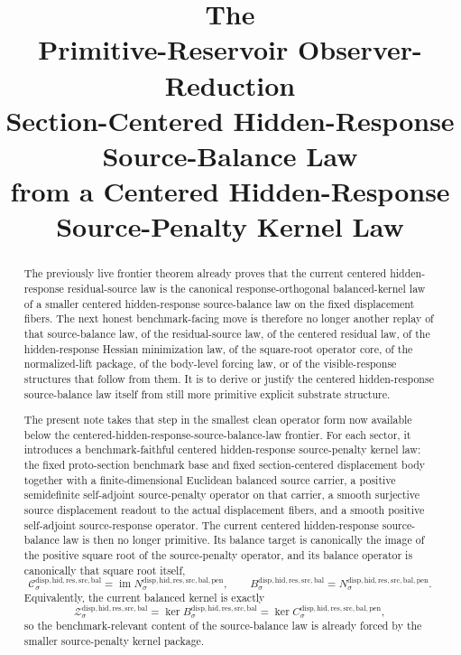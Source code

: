 \documentclass[11pt]{article}
\title{\textbf{The \TheoryName{}}\\[0.4em]
\large Primitive-Reservoir Observer-Reduction\\
\large Section-Centered Hidden-Response\\
\large Source-Balance Law\\
\large from a Centered Hidden-Response\\
\large Source-Penalty Kernel Law}
\author{}
\date{}
\newcommand{\SourceBalanceTarget}[1]{\mathcal C_{#1}^{\mathrm{disp,hid,res,src,bal}}}
\newcommand{\SourceBalanceOperator}[1]{B_{#1}^{\mathrm{disp,hid,res,src,bal}}}
\newcommand{\SourceBalancedState}[1]{\mathcal Z_{#1}^{\mathrm{disp,hid,res,src,bal}}}
\newcommand{\SourcePenaltyOperator}[1]{C_{#1}^{\mathrm{disp,hid,res,src,bal,pen}}}
\newcommand{\SourcePenaltySquareRoot}[1]{N_{#1}^{\mathrm{disp,hid,res,src,bal,pen}}}
\begin{document}
\maketitle

\begin{abstract}
The previously live frontier theorem already proves that the current centered hidden-response residual-source law is the canonical response-orthogonal balanced-kernel law of a smaller centered hidden-response source-balance law on the fixed displacement fibers. The next honest benchmark-facing move is therefore no longer another replay of that source-balance law, of the residual-source law, of the centered residual law, of the hidden-response Hessian minimization law, of the square-root operator core, of the normalized-lift package, of the body-level forcing law, or of the visible-response structures that follow from them. It is to derive or justify the centered hidden-response source-balance law itself from still more primitive explicit substrate structure.

The present note takes that step in the smallest clean operator form now available below the centered-hidden-response-source-balance-law frontier. For each sector, it introduces a benchmark-faithful centered hidden-response source-penalty kernel law: the fixed proto-section benchmark base and fixed section-centered displacement body together with a finite-dimensional Euclidean balanced source carrier, a positive semidefinite self-adjoint source-penalty operator on that carrier, a smooth surjective source displacement readout to the actual displacement fibers, and a smooth positive self-adjoint source-response operator. The current centered hidden-response source-balance law is then no longer primitive. Its balance target is canonically the image of the positive square root of the source-penalty operator, and its balance operator is canonically that square root itself,
\[
\SourceBalanceTarget{\sigma}
=
\operatorname{im}\SourcePenaltySquareRoot{\sigma},
\qquad
\SourceBalanceOperator{\sigma}
=
\SourcePenaltySquareRoot{\sigma}.
\]
Equivalently, the current balanced kernel is exactly
\[
\SourceBalancedState{\sigma}
=
\ker \SourceBalanceOperator{\sigma}
=
\ker \SourcePenaltyOperator{\sigma},
\]
so the benchmark-relevant content of the source-balance law is already forced by the smaller source-penalty kernel package.


\end{abstract}
\end{document}
